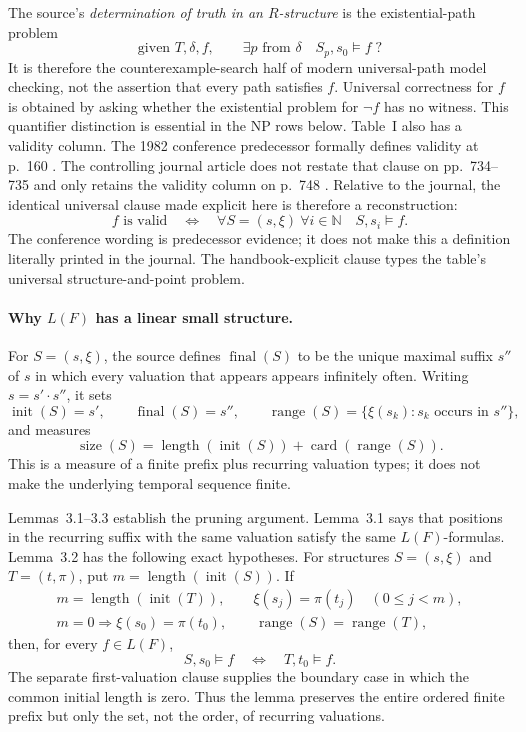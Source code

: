 The source's \emph{determination of truth in an \(R\)-structure} is the
existential-path problem
\[
 \text{given }T,\delta,f,\qquad
 \exists p\text{ from }\delta\quad S_p,s_0\models f\;?
\]
It is therefore the counterexample-search half of modern universal-path model
checking, not the assertion that every path satisfies \(f\).  Universal
correctness for \(f\) is obtained by asking whether the existential problem
for \(\neg f\) has no witness.  This quantifier distinction is essential in
the NP rows below.  Table~I also has a validity column.  The 1982 conference
predecessor formally defines validity at p.~160
\cite[p.~160]{SistlaClarke1982}.  The controlling journal article does not
restate that clause on pp.~734--735 and only retains the validity column on
p.~748 \cite[pp.~735, 748]{SistlaClarke1985}.  Relative to the journal, the
identical universal clause made explicit here is therefore a reconstruction:
\[
 f\text{ is valid}
 \quad\Longleftrightarrow\quad
 \forall S=(s,\xi)\ \forall i\in\mathbb N\quad S,s_i\models f.
\]
The conference wording is predecessor evidence; it does not make this a
definition literally printed in the journal.  The handbook-explicit clause
types the table's universal structure-and-point problem.

\paragraph{Why \(L(F)\) has a linear small structure.}
For \(S=(s,\xi)\), the source defines \(\operatorname{final}(S)\) to be the
unique maximal suffix \(s''\) of \(s\) in which every valuation that appears
appears infinitely often.  Writing \(s=s'\mathbin{\cdot}s''\), it sets
\[
 \operatorname{init}(S)=s',
 \qquad
 \operatorname{final}(S)=s'',
 \qquad
 \operatorname{range}(S)
 =\{\xi(s_k):s_k\text{ occurs in }s''\},
\]
and measures
\[
 \operatorname{size}(S)
 =
 \operatorname{length}(\operatorname{init}(S))
 +
 \operatorname{card}(\operatorname{range}(S)).
\]
This is a measure of a finite prefix plus recurring valuation types; it does
not make the underlying temporal sequence finite.

Lemmas~3.1--3.3 establish the pruning argument.  Lemma~3.1 says that positions
in the recurring suffix with the same valuation satisfy the same
\(L(F)\)-formulas.  Lemma~3.2 has the following exact hypotheses.  For
structures \(S=(s,\xi)\) and \(T=(t,\pi)\), put
\(m=\operatorname{length}(\operatorname{init}(S))\).  If
\[
\begin{gathered}
 m=\operatorname{length}(\operatorname{init}(T)),\qquad
 \xi(s_j)=\pi(t_j)\quad(0\le j<m),\\
 m=0\Longrightarrow\xi(s_0)=\pi(t_0),\qquad
 \operatorname{range}(S)=\operatorname{range}(T),
\end{gathered}
\]
then, for every \(f\in L(F)\),
\[
 S,s_0\models f\quad\Longleftrightarrow\quad T,t_0\models f.
\]
The separate first-valuation clause supplies the boundary case in which the
common initial length is zero.  Thus the lemma preserves the entire ordered
finite prefix but only the set, not the order, of recurring valuations.


